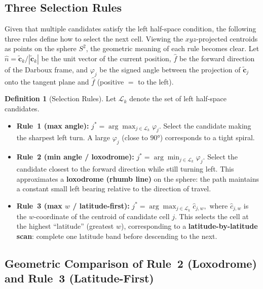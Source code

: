 \documentclass[12pt,a4paper]{article}
\theoremstyle{definition}
\newtheorem{defn}{Definition}[section]
\begin{document}
\subsection{Three Selection Rules}

Given that multiple candidates satisfy the left half-space condition,
the following three rules define how to select the next cell.
Viewing the $xyz$-projected centroids as points on the sphere $S^2$,
the geometric meaning of each rule becomes clear.
Let $\hat{n} = \tilde{\mathbf{c}}_k / |\tilde{\mathbf{c}}_k|$
be the unit vector of the current position,
$\hat{f}$ be the forward direction of the Darboux frame,
and $\varphi_j$ be the signed angle between the projection of
$\tilde{\mathbf{c}}_j$ onto the tangent plane and $\hat{f}$
(positive $=$ to the left).

\begin{defn}[Selection Rules]
  \label{defn:rules}
  Let $\mathcal{L}_k$ denote the set of left half-space candidates.
  \begin{itemize}
    \item \textbf{Rule~1 (max angle):}
      $\displaystyle j^* = \arg\max_{j \in \mathcal{L}_k} \varphi_j.$
      Select the candidate making the sharpest left turn.
      A large $\varphi_j$ (close to $90°$) corresponds to a tight spiral.
    \item \textbf{Rule~2 (min angle / loxodrome):}
      $\displaystyle j^* = \arg\min_{j \in \mathcal{L}_k} \varphi_j.$
      Select the candidate closest to the forward direction while still
      turning left.
      This approximates a \textbf{loxodrome (rhumb line)} on the sphere:
      the path maintains a constant small left bearing relative to the
      direction of travel.
    \item \textbf{Rule~3 (max $w$ / latitude-first):}
      $\displaystyle j^* = \arg\max_{j \in \mathcal{L}_k} \hat{c}_{j,w},$
      where $\hat{c}_{j,w}$ is the $w$-coordinate of the centroid of
      candidate cell $j$.
      This selects the cell at the highest ``latitude'' (greatest $w$),
      corresponding to a \textbf{latitude-by-latitude scan}: complete one
      latitude band before descending to the next.
  \end{itemize}
\end{defn}

\subsection{Geometric Comparison of Rule~2 (Loxodrome) and Rule~3 (Latitude-First)}
\end{document}
